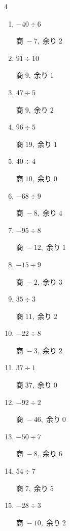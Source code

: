 \begin{multicols}{4}
\begin{enumerate}
  \item $-40 \div 6$

        $商\; -7,\; 余り\; 2$

\columnbreak %

  \item $91 \div 10$

        $商\; 9,\; 余り\; 1$

  \item $47 \div 5$

        $商\; 9,\; 余り\; 2$

  \item $96 \div 5$

        $商\; 19,\; 余り\; 1$

  \item $40 \div 4$

        $商\; 10,\; 余り\; 0$

  \item $-68 \div 9$

        $商\; -8,\; 余り\; 4$

  \item $-95 \div 8$

        $商\; -12,\; 余り\; 1$

  \item $-15 \div 9$

        $商\; -2,\; 余り\; 3$

  \item $35 \div 3$

        $商\; 11,\; 余り\; 2$

  \item $-22 \div 8$

        $商\; -3,\; 余り\; 2$

  \item $37 \div 1$

        $商\; 37,\; 余り\; 0$

  \item $-92 \div 2$

        $商\; -46,\; 余り\; 0$

  \item $-50 \div 7$

        $商\; -8,\; 余り\; 6$

  \item $54 \div 7$

        $商\; 7,\; 余り\; 5$

  \item $-28 \div 3$

        $商\; -10,\; 余り\; 2$


\end{enumerate}
\end{multicols}
